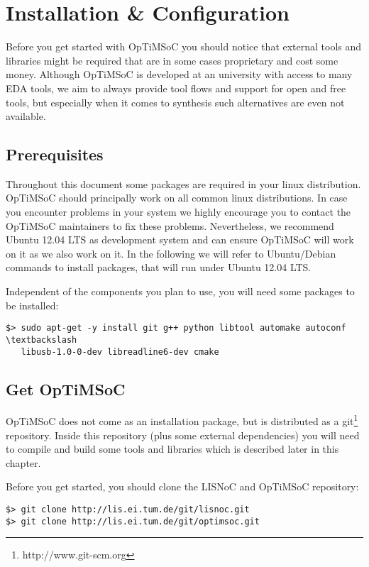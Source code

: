 \chapter{Installation \& Configuration}
\label{chap:installation}

Before you get started with OpTiMSoC you should notice that external
tools and libraries might be required that are in some cases
proprietary and cost some money. Although OpTiMSoC is developed at an
university with access to many EDA tools, we aim to always provide
tool flows and support for open and free tools, but especially when it
comes to synthesis such alternatives are even not available.

\section{Prerequisites}

Throughout this document some packages are required in your linux
distribution. OpTiMSoC should principally work on all common linux
distributions. In case you encounter problems in your system we highly
encourage you to contact the OpTiMSoC maintainers to fix these
problems. Nevertheless, we recommend Ubuntu 12.04 LTS as development
system and can ensure OpTiMSoC will work on it as we also work on it.
In the following we will refer to Ubuntu/Debian commands to install
packages, that will run under Ubuntu 12.04 LTS.

Independent of the components you plan to use, you will need some
packages to be installed:

\begin{verbatim}
$> sudo apt-get -y install git g++ python libtool automake autoconf
\textbackslash
   libusb-1.0-0-dev libreadline6-dev cmake
\end{verbatim}

\section{Get OpTiMSoC}

OpTiMSoC does not come as an installation package, but is distributed
as a git\footnote{http://www.git-scm.org} repository. Inside this
repository (plus some external dependencies) you will need to compile
and build some tools and libraries which is described later in this
chapter.

Before you get started, you should clone the LISNoC and OpTiMSoC
repository:

\begin{verbatim}
$> git clone http://lis.ei.tum.de/git/lisnoc.git
$> git clone http://lis.ei.tum.de/git/optimsoc.git
\end{verbatim}

